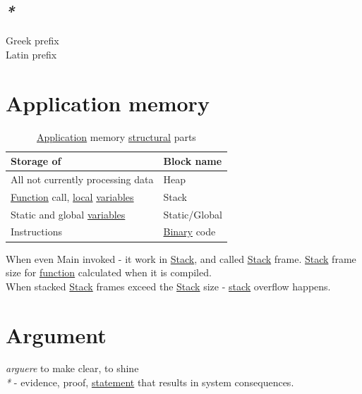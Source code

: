 \documentclass[a4paper,14pt,oneside]{book}
\begin{document}
\section{\emph{*}}
\label{sec:orgade3194}

\label{orgaa7b262}Greek prefix\\
\label{org0c71d0e}Latin prefix\\

\chapter{\label{org93869f8}Application memory}
\label{sec:org95bc857}
\begin{table}[htbp]
\caption{\label{tab:application-memory-structural-parts}\hyperref[org5c027e8]{Application} memory \hyperref[orgbd6a941]{structural} parts}
\centering
\begin{tabular}{ll}
Storage of & Block name\\
\hline
All not currently processing data & \label{org152fd26}Heap\\
\hyperref[org8cc2ae4]{Function} call, \hyperref[org1cee1e1]{local} \hyperref[org8831698]{variables} & \label{org65341ae}Stack\\
Static and global \hyperref[org8831698]{variables} & Static/Global\\
Instructions & \hyperref[orgd0575cd]{Binary} code\\
\end{tabular}
\end{table}

When even Main invoked - it work in \hyperref[org65341ae]{Stack}, and called \hyperref[org65341ae]{Stack} frame. \hyperref[org65341ae]{Stack} frame size for \hyperref[org8cc2ae4]{function} calculated when it is compiled.\\
When stacked \hyperref[org65341ae]{Stack} frames exceed the \hyperref[org65341ae]{Stack} size - \hyperref[org65341ae]{stack} overflow happens.\\

\chapter{\label{org8cb9182}Argument}
\label{sec:org5eadff0}
\emph{arguere} to make clear, to shine\\

\emph{*} - evidence, proof, \hyperref[org722f075]{statement} that results in system consequences.\\
\end{document}
